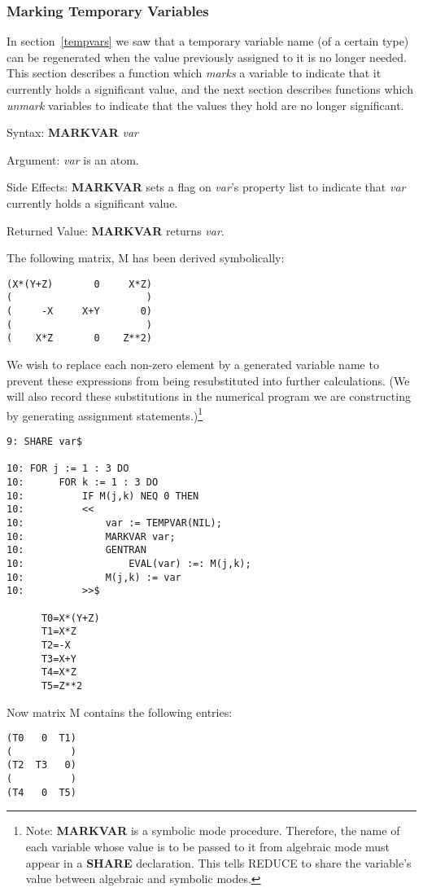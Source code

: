 \subsubsection{Marking Temporary Variables}
In section~\ref{tempvars} we saw that a temporary variable name (of a certain
type) can be regenerated when the value previously assigned to it
is no longer needed.  This section describes a function which {\it marks}
a variable to indicate that it currently holds a
significant value, and the next section describes functions which
{\it unmark} variables to indicate that the values they hold are no
longer significant.
\begin{describe}{Syntax:}
{\bf MARKVAR} {\it  var}
\end{describe}
\begin{describe}{Argument:}
{\it var} is an atom.
\end{describe}
\begin{describe}{Side Effects:}
{\bf MARKVAR} sets a flag on {\it var}'s property list to indicate that
{\it var} currently holds a significant value.
\end{describe}
\begin{describe}{Returned Value:}
{\bf MARKVAR} returns {\it var}.
\end{describe}
\begin{describe}{\example}
The following matrix, M has been derived symbolically:
\begin{verbatim}
(X*(Y+Z)       0     X*Z)
(                       )
(     -X     X+Y       0)
(                       )
(    X*Z       0    Z**2)
\end{verbatim}
We wish to replace each non-zero element by a generated variable name
to prevent these expressions from being resubstituted into further
calculations.  (We will also record these substitutions in the
numerical program we are constructing by generating assignment
statements.)\footnote{ Note: {\bf MARKVAR} is a symbolic mode
procedure.  Therefore, the name of each variable whose value is to be
passed to it from algebraic mode must appear in a {\bf SHARE}
 declaration.  This tells REDUCE to share the
variable's value between algebraic and symbolic modes.}
\begin{verbatim}
9: SHARE var$

10: FOR j := 1 : 3 DO
10:      FOR k := 1 : 3 DO
10:          IF M(j,k) NEQ 0 THEN
10:          <<
10:              var := TEMPVAR(NIL);
10:              MARKVAR var;
10:              GENTRAN
10:                  EVAL(var) :=: M(j,k);
10:              M(j,k) := var
10:          >>$

      T0=X*(Y+Z)
      T1=X*Z
      T2=-X
      T3=X+Y
      T4=X*Z
      T5=Z**2
\end{verbatim}
Now matrix M contains the following entries:
\begin{verbatim}
(T0   0  T1)
(          )
(T2  T3   0)
(          )
(T4   0  T5)
\end{verbatim}
\end{describe}

